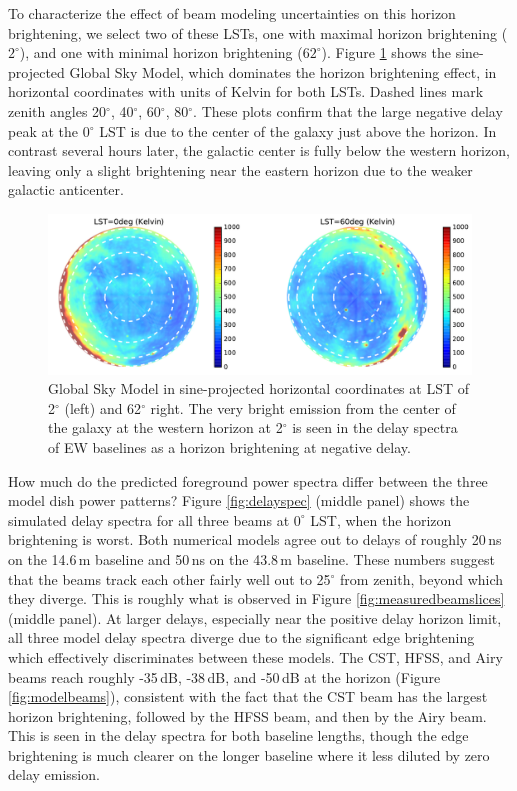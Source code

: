 \documentclass{emulateapj}
\begin{document}
To characterize the effect of beam modeling uncertainties on this horizon brightening, we select two of these LSTs, one with maximal horizon brightening ($2^\circ$), and one with minimal horizon brightening ($62^\circ$). Figure \ref{fig:gsmplots} shows the sine-projected Global Sky Model, which dominates the horizon brightening effect, in horizontal coordinates with units of Kelvin for both LSTs. Dashed lines mark zenith angles 20$^\circ$, 40$^\circ$, 60$^\circ$, 80$^\circ$. These plots confirm that the large negative delay peak at the 0$^\circ$ LST is due to the center of the galaxy just above the horizon. In contrast several hours later, the galactic center is fully below the western horizon, leaving only a slight brightening near the eastern horizon due to the weaker galactic anticenter. 

\begin{figure}[h]
\centering
\includegraphics[width=6in]{gsm_kelvin_LST_2deg_and_62deg.pdf}
\caption{Global Sky Model \citep{gsm} in sine-projected horizontal coordinates at LST of 2$^\circ$ (left) and 62$^\circ$ right. The very bright emission from the center of the galaxy at the western horizon at 2$^\circ$ is seen in the delay spectra of EW baselines as a horizon brightening at negative delay.}
\label{fig:gsmplots}
\end{figure}

How much do the predicted foreground power spectra differ between the three model dish power patterns? Figure \ref{fig:delayspec} (middle panel) shows the simulated delay spectra for all three beams at $0^\circ$ LST, when the horizon brightening is worst. Both numerical models agree out to delays of roughly 20\,ns on the 14.6\,m baseline and 50\,ns on the 43.8\,m baseline. These numbers suggest that the beams track each other fairly well out to 25$^\circ$ from zenith, beyond which they diverge. This is roughly what is observed in Figure \ref{fig:measuredbeamslices} (middle panel). At larger delays, especially near the positive delay horizon limit, all three model delay spectra diverge due to the significant edge brightening which effectively discriminates between these models. The CST, HFSS, and Airy beams reach roughly -35\,dB, -38\,dB, and -50\,dB at the horizon (Figure \ref{fig:modelbeams}), consistent with the fact that the CST beam has the largest horizon brightening, followed by the HFSS beam, and then by the Airy beam. This is seen in the delay spectra for both baseline lengths, though the edge brightening is much clearer on the longer baseline where it less diluted by zero delay emission.  
\end{document}
